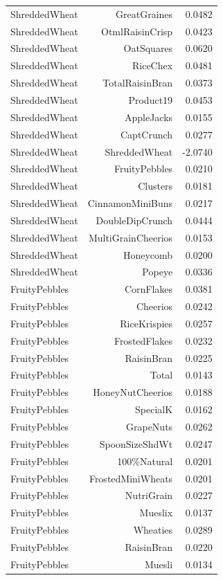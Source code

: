 \begin{longtable}{@{}lrr@{}}
ShreddedWheat & GreatGraines & 0.0482 \\
ShreddedWheat & OtmlRaisinCrisp & 0.0423 \\
ShreddedWheat & OatSquares & 0.0620 \\
ShreddedWheat & RiceChex & 0.0481 \\
ShreddedWheat & TotalRaisinBran & 0.0373 \\
ShreddedWheat & Product19 & 0.0453 \\
ShreddedWheat & AppleJacks & 0.0155 \\
ShreddedWheat & CaptCrunch & 0.0277 \\
ShreddedWheat & ShreddedWheat & -2.0740 \\
ShreddedWheat & FruityPebbles & 0.0210 \\
ShreddedWheat & Clusters & 0.0181 \\
ShreddedWheat & CinnamonMiniBuns & 0.0217 \\
ShreddedWheat & DoubleDipCrunch & 0.0444 \\
ShreddedWheat & MultiGrainCheerios & 0.0153 \\
ShreddedWheat & Honeycomb & 0.0200 \\
ShreddedWheat & Popeye & 0.0336 \\
FruityPebbles & CornFlakes & 0.0381 \\
FruityPebbles & Cheerios & 0.0242 \\
FruityPebbles & RiceKrispies & 0.0257 \\
FruityPebbles & FrostedFlakes & 0.0232 \\
FruityPebbles & RaisinBran & 0.0225 \\
FruityPebbles & Total & 0.0143 \\
FruityPebbles & HoneyNutCheerios & 0.0188 \\
FruityPebbles & SpecialK & 0.0162 \\
FruityPebbles & GrapeNuts & 0.0262 \\
FruityPebbles & SpoonSizeShdWt & 0.0247 \\
FruityPebbles & 100\%Natural & 0.0201 \\
FruityPebbles & FrostedMiniWheats & 0.0201 \\
FruityPebbles & NutriGrain & 0.0227 \\
FruityPebbles & Mueslix & 0.0137 \\
FruityPebbles & Wheaties & 0.0289 \\
FruityPebbles & RaisinBran & 0.0220 \\
FruityPebbles & Muesli & 0.0134 \\

\end{longtable}
